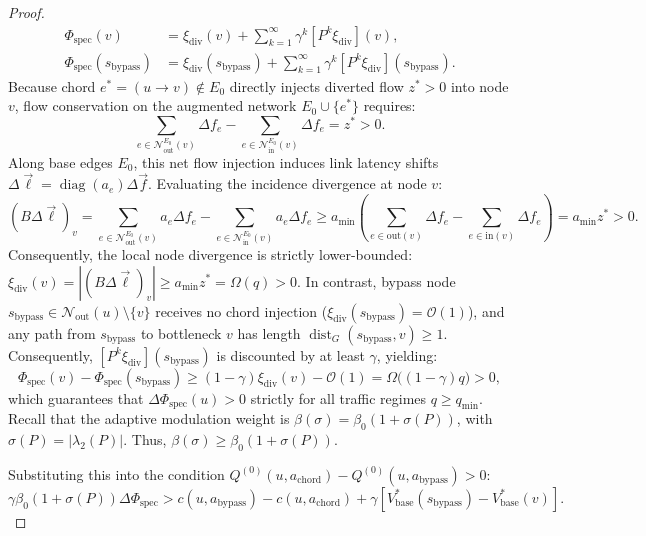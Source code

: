 \documentclass[11pt,a4paper]{article}
\begin{document}
\begin{proof}
\begin{align}
\Phi_{\text{spec}}(v) &= \xi_{\text{div}}(v) + \sum_{k=1}^\infty \gamma^k [P^k \xi_{\text{div}}](v), \\
\Phi_{\text{spec}}(s_{\text{bypass}}) &= \xi_{\text{div}}(s_{\text{bypass}}) + \sum_{k=1}^\infty \gamma^k [P^k \xi_{\text{div}}](s_{\text{bypass}}).
\end{align}
Because chord $e^* = (u \to v) \notin E_0$ directly injects diverted flow $z^* > 0$ into node $v$, flow conservation on the augmented network $E_0 \cup \{e^*\}$ requires:
\begin{equation}
\sum_{e \in \mathcal{N}_{\text{out}}^{E_0}(v)} \Delta f_e - \sum_{e \in \mathcal{N}_{\text{in}}^{E_0}(v)} \Delta f_e = z^* > 0.
\end{equation}
Along base edges $E_0$, this net flow injection induces link latency shifts $\Delta \vec{\ell} = \operatorname{diag}(a_e) \Delta \vec{f}$. Evaluating the incidence divergence at node $v$:
\begin{equation}
(B \Delta \vec{\ell})_v = \sum_{e \in \mathcal{N}_{\text{out}}^{E_0}(v)} a_e \Delta f_e - \sum_{e \in \mathcal{N}_{\text{in}}^{E_0}(v)} a_e \Delta f_e \ge a_{\min} \left( \sum_{e \in \text{out}(v)} \Delta f_e - \sum_{e \in \text{in}(v)} \Delta f_e \right) = a_{\min} z^* > 0.
\end{equation}
Consequently, the local node divergence is strictly lower-bounded: $\xi_{\text{div}}(v) = |(B \Delta \vec{\ell})_v| \ge a_{\min} z^* = \Omega(q) > 0$. In contrast, bypass node $s_{\text{bypass}} \in \mathcal{N}_{\text{out}}(u) \setminus \{v\}$ receives no chord injection ($\xi_{\text{div}}(s_{\text{bypass}}) = \mathcal{O}(1)$), and any path from $s_{\text{bypass}}$ to bottleneck $v$ has length $\operatorname{dist}_G(s_{\text{bypass}}, v) \ge 1$. Consequently, $[P^k \xi_{\text{div}}](s_{\text{bypass}})$ is discounted by at least $\gamma$, yielding:
\begin{equation}
\label{eq:delta_phi_spec_strictly_positive_proof}
\Phi_{\text{spec}}(v) - \Phi_{\text{spec}}(s_{\text{bypass}}) \ge (1 - \gamma) \xi_{\text{div}}(v) - \mathcal{O}(1) = \Omega\big((1 - \gamma) q\big) > 0,
\end{equation}
which guarantees that $\Delta \Phi_{\text{spec}}(u) > 0$ strictly for all traffic regimes $q \ge q_{\min}$.
Recall that the adaptive modulation weight is $\beta(\sigma) = \beta_0 (1 + \sigma(P))$, with $\sigma(P) = |\lambda_2(P)|$. Thus, $\beta(\sigma) \ge \beta_0 (1 + \sigma(P))$.

Substituting this into the condition $Q^{(0)}(u, a_{\text{chord}}) - Q^{(0)}(u, a_{\text{bypass}}) > 0$:
\begin{equation}
\label{eq:beta_isolation_ineq}
\gamma \beta_0 (1 + \sigma(P)) \Delta \Phi_{\text{spec}} > c(u, a_{\text{bypass}}) - c(u, a_{\text{chord}}) + \gamma \left[ V_{\text{base}}^*(s_{\text{bypass}}) - V_{\text{base}}^*(v) \right].
\end{equation}

\end{proof}
\end{document}

